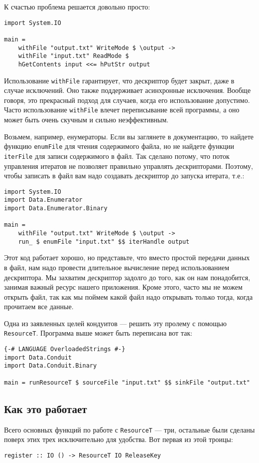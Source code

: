 К счастью проблема решается довольно просто:
\begin{lstlisting}
import System.IO

main =
    withFile "output.txt" WriteMode $ \output ->
    withFile "input.txt" ReadMode $ 
    hGetContents input <<= hPutStr output
\end{lstlisting}

Использование \lstinline'withFile' гарантирует, что дескриптор будет закрыт, даже в
случае
исключений. Оно также поддерживает асинхронные исключения. Вообще говоря, это прекрасный
подход для случаев, когда его использование допустимо. Часто использование \lstinline'withFile' влечет переписывание всей программы, а оно может быть очень
скучным и сильно неэффективным.

Возьмем, например, енумераторы. Если вы заглянете в документацию, то найдете функцию
\lstinline'enumFile' для чтения содержимого файла, но не найдете функции
\lstinline'iterFile' для записи
содержимого в файл. Так сделано потому, что поток управления итератов не позволяет
правильно управлять дескрипторами. Поэтому, чтобы записать в файл вам надо создавать
дескриптор до запуска итерата, т.е.: 

\begin{lstlisting}
import System.IO
import Data.Enumerator
import Data.Enumerator.Binary

main =
    withFile "output.txt" WriteMode $ \output ->
    run_ $ enumFile "input.txt" $$ iterHandle output
\end{lstlisting}

Этот код работает хорошо, но представьте, что вместо простой передачи данных в файл, нам
надо провести длительное вычисление перед использованием дескриптора. Мы захватим
дескриптор задолго до того, как он нам понадобится, занимая важный ресурс нашего
приложения. Кроме этого, часто мы не можем открыть файл, так как мы поймем какой файл
надо открывать только тогда, когда прочитаем все данные.

Одна из заявленных целей кондуитов --- решить эту пролему с помощью \lstinline'ResourceT'.
Программа выше может быть переписана вот так:
\begin{lstlisting}
{-# LANGUAGE OverloadedStrings #-}
import Data.Conduit
import Data.Conduit.Binary

main = runResourceT $ sourceFile "input.txt" $$ sinkFile "output.txt"
\end{lstlisting}

\subsection{Как это работает}
Всего основных функций по работе с \lstinline'ResourceT' --- три, остальные были
сделаны поверх этих трех исключительно для удобства. Вот первая из этой троицы:
\begin{lstlisting}
register :: IO () -> ResourceT IO ReleaseKey
\end{lstlisting}

